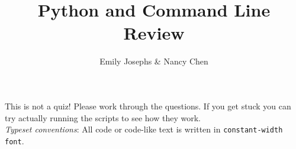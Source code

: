\documentclass[11pt]{article}
\title{Python and Command Line Review}
\author{Emily Josephs \& Nancy Chen}
\begin{document}
\maketitle


This is not a quiz! Please work through the questions. If you get stuck you can try actually running the scripts to see how they work. \\
\textsl{Typeset conventions}: All code or code-like text is written in \texttt{constant-width font}.\\
\end{document}
